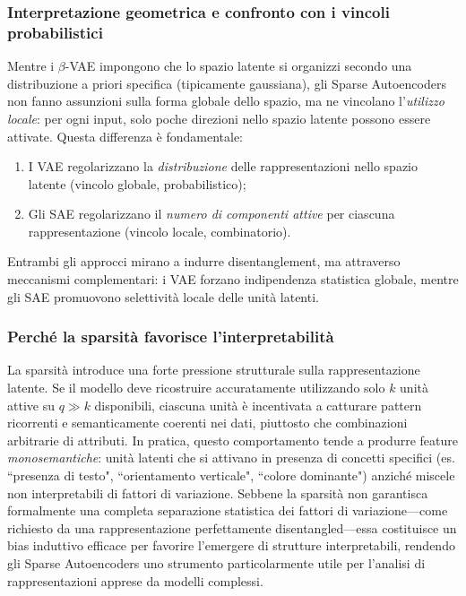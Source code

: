 \subsubsection{Interpretazione geometrica e confronto con i vincoli probabilistici}

Mentre i $\beta$-VAE impongono che lo spazio latente si organizzi secondo una distribuzione a priori specifica (tipicamente gaussiana), gli Sparse Autoencoders non fanno assunzioni sulla forma globale dello spazio, ma ne vincolano l'\textit{utilizzo locale}: per ogni input, solo poche direzioni nello spazio latente possono essere attivate.
Questa differenza è fondamentale:
\begin{enumerate}
    \item I VAE regolarizzano la \textit{distribuzione} delle rappresentazioni nello spazio latente (vincolo globale, probabilistico);
    \item Gli SAE regolarizzano il \textit{numero di componenti attive} per ciascuna rappresentazione (vincolo locale, combinatorio).
\end{enumerate}
Entrambi gli approcci mirano a indurre disentanglement, ma attraverso meccanismi complementari: i VAE forzano indipendenza statistica globale, mentre gli SAE promuovono selettività locale delle unità latenti.
\subsubsection{Perché la sparsità favorisce l'interpretabilità}
La sparsità introduce una forte pressione strutturale sulla rappresentazione latente. Se il modello deve ricostruire accuratamente utilizzando solo $k$ unità attive su $q \gg k$ disponibili, ciascuna unità è incentivata a catturare pattern ricorrenti e semanticamente coerenti nei dati, piuttosto che combinazioni arbitrarie di attributi.
In pratica, questo comportamento tende a produrre feature \textit{monosemantiche}: unità latenti che si attivano in presenza di concetti specifici (es. ``presenza di testo", ``orientamento verticale", ``colore dominante") anziché miscele non interpretabili di fattori di variazione.
Sebbene la sparsità non garantisca formalmente una completa separazione statistica dei fattori di variazione—come richiesto da una rappresentazione perfettamente disentangled—essa costituisce un bias induttivo efficace per favorire l'emergere di strutture interpretabili, rendendo gli Sparse Autoencoders uno strumento particolarmente utile per l'analisi di rappresentazioni apprese da modelli complessi.


